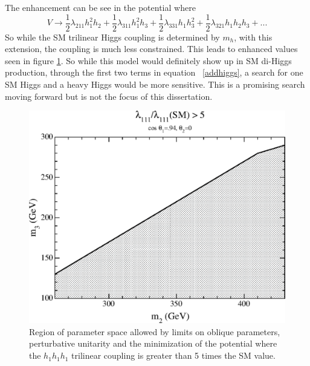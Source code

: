 The enhancement can be see in the potential where 
\begin{equation}
V \rightarrow \frac{1}{2}\lambda_{211}h_{1}^{2}h_{2} + \frac{1}{2}\lambda_{311}h_{1}^{2}h_{3} + \frac{1}{2}\lambda_{331}h_{1}h_{3}^{2} + \frac{1}{2}\lambda_{321}h_{1}h_{2}h_{3} + . . .
\label{addhiggs}
\end{equation}
So while the SM trilinear Higgs coupling is determined by ${m_{h}}$, with this extension, the coupling is much less constrained. This leads to enhanced values seen in figure \ref{fig:CHS8}. So while this model would definitely show up in SM di-Higgs production, through the first two terms in equation ~\ref{addhiggs}, a search for one SM Higgs and a heavy Higgs would be more sensitive. This is a promising search moving forward but is not the focus of this dissertation.
\begin{figure}[h]
\begin{center}
\includegraphics[scale=0.65]{figures/CompHiggsSing_Fig8}
\caption{Region of parameter space allowed by limits on oblique parameters, perturbative unitarity and the minimization of the potential where the ${h_{1}h_{1}h_{1}}$ trilinear coupling is greater than 5 times the SM value.}
\label{fig:CHS8}
\end{center}
\end{figure}

